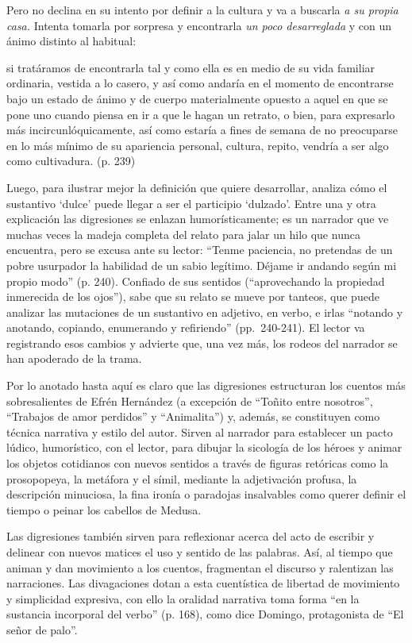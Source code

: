 \documentclass[14pt,twoside,final]{extbook} %
\begin{document}
Pero no declina en su intento por definir a la cultura y va a buscarla \emph{a su propia casa.} Intenta tomarla por sorpresa y encontrarla \emph{un poco desarreglada} y con un ánimo distinto al habitual:
\begin{quoting}
si tratáramos de encontrarla tal y como ella es en medio de su vida familiar ordinaria, vestida a lo casero, y así como andaría en el momento de encontrarse bajo un estado de ánimo y de cuerpo materialmente opuesto a aquel en que se pone uno cuando piensa en ir a que le hagan un retrato, o bien, para expresarlo más incircunlóquicamente, así como estaría a fines de semana de no preocuparse en lo más mínimo de su apariencia personal, cultura, repito, vendría a ser algo como cultivadura. (p. 239)
\end{quoting}
Luego, para ilustrar mejor la definición que quiere desarrollar, analiza cómo el sustantivo `dulce' puede llegar a ser el participio `dulzado'. Entre una y otra explicación las digresiones se enlazan
humorísticamente; es un narrador que ve muchas veces la madeja completa del relato para jalar un hilo que nunca encuentra, pero se excusa ante su lector: ``Tenme paciencia, no pretendas de un pobre usurpador la habilidad de un sabio legítimo. Déjame ir andando según mi propio modo'' (p. 240). Confiado de sus sentidos (``aprovechando la propiedad inmerecida de los ojos''), sabe que su relato se mueve por tanteos, que puede analizar las mutaciones de un sustantivo en adjetivo, en verbo, e irlas ``notando y anotando, copiando, enumerando y refiriendo'' (pp.~\mbox{240-241}). El lector va registrando esos cambios y advierte que, una vez más, los rodeos del narrador se han apoderado de la trama.

Por lo anotado hasta aquí es claro que las digresiones estructuran los cuentos más sobresalientes de Efrén Hernández (a excepción de ``Toñito entre nosotros'', ``Trabajos de amor perdidos'' y ``Animalita'') y, además, se constituyen como técnica narrativa y estilo del autor. Sirven al narrador para establecer un pacto lúdico, humorístico, con el lector, para dibujar la sicología de los héroes y animar los objetos cotidianos con nuevos sentidos a través de figuras retóricas como la prosopopeya, la metáfora y el símil, mediante la adjetivación profusa, la descripción minuciosa, la fina ironía o paradojas insalvables como querer definir el tiempo o peinar los cabellos de Medusa.

Las digresiones también sirven para reflexionar acerca del acto de escribir y delinear con nuevos matices el uso y sentido de las palabras. Así, al tiempo que animan y dan movimiento a los cuentos, fragmentan el discurso y ralentizan las narraciones. Las divagaciones dotan a esta cuentística de libertad de movimiento y simplicidad expresiva, con ello la oralidad narrativa toma forma ``en la sustancia incorporal del verbo'' (p. 168), como dice Domingo, protagonista de ``El señor de palo''.
\end{document}
